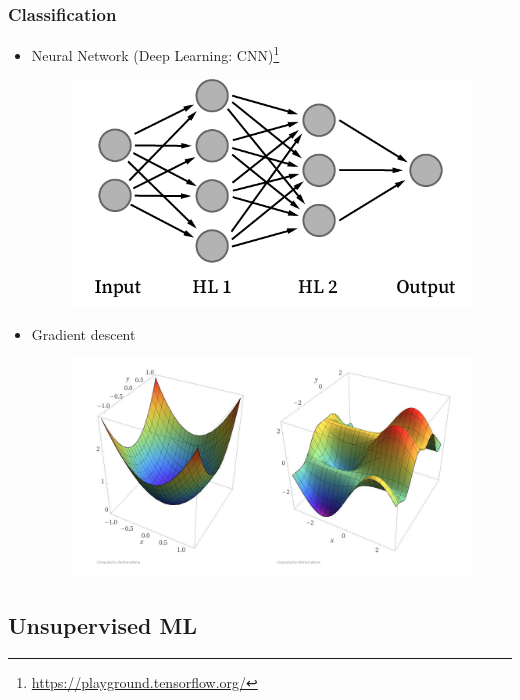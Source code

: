 \begin{frame}\frametitle{Classification}
   \begin{itemize}
      \item Neural Network (Deep Learning: CNN)\footnote{\href{https://playground.tensorflow.org/}{https://playground.tensorflow.org/}}
      \begin{figure}[H]
         \includegraphics[scale=.25]{../images/illustrations/model_neural_network.png}
      \end{figure}
      
      \item Gradient descent
      \begin{figure}[H]
         \includegraphics[scale=.14]{../images/illustrations/model_optimization_gradient_descent.jpeg}
      \end{figure}
   \end{itemize}
\end{frame}


\subsection{Unsupervised ML}


